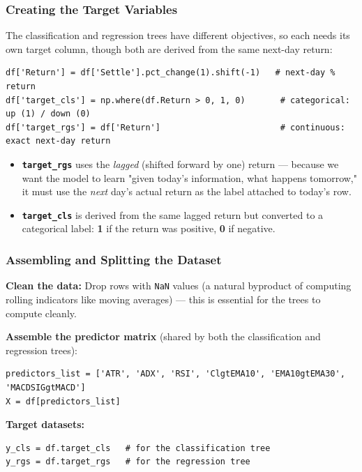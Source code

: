 \documentclass[12pt,openany]{book}
\begin{document}
\subsubsection{Creating the Target Variables}


The classification and regression trees have different objectives, so each needs its own target column, though both are derived from the same next-day return:

\begin{Verbatim}[breaklines=true,fontsize=\small]
df['Return'] = df['Settle'].pct_change(1).shift(-1)   # next-day % return
df['target_cls'] = np.where(df.Return > 0, 1, 0)       # categorical: up (1) / down (0)
df['target_rgs'] = df['Return']                        # continuous: exact next-day return
\end{Verbatim}


\begin{itemize}[leftmargin=*]
    \item \textbf{\texttt{target\_rgs}} uses the \textit{lagged} (shifted forward by one) return --- because we want the model to learn "given today's information, what happens tomorrow," it must use the \textit{next} day's actual return as the label attached to today's row.
    \item \textbf{\texttt{target\_cls}} is derived from the same lagged return but converted to a categorical label: \textbf{1} if the return was positive, \textbf{0} if negative.
\end{itemize}


\subsubsection{Assembling and Splitting the Dataset}


\textbf{Clean the data:} Drop rows with \texttt{NaN} values (a natural byproduct of computing rolling indicators like moving averages) --- this is essential for the trees to compute cleanly.

\textbf{Assemble the predictor matrix} (shared by both the classification and regression trees):

\begin{Verbatim}[breaklines=true,fontsize=\small]
predictors_list = ['ATR', 'ADX', 'RSI', 'ClgtEMA10', 'EMA10gtEMA30', 'MACDSIGgtMACD']
X = df[predictors_list]
\end{Verbatim}


\textbf{Target datasets:}
\begin{Verbatim}[breaklines=true,fontsize=\small]
y_cls = df.target_cls   # for the classification tree
y_rgs = df.target_rgs   # for the regression tree
\end{Verbatim}
\end{document}
